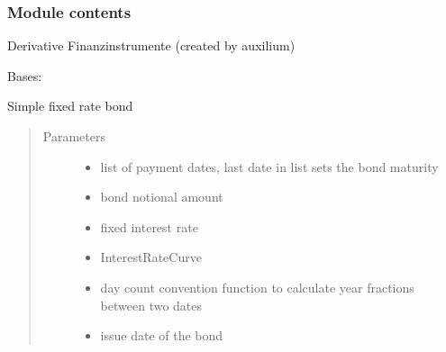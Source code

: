 \documentclass[a4paper,10pt,english]{sphinxmanual}
\begin{document}
\subsubsection{Module contents}
\label{\detokenize{api/Derivate:module-Derivate}}\label{\detokenize{api/Derivate:module-contents}}
\sphinxAtStartPar
Derivative Finanzinstrumente (created by auxilium)

\begin{fulllineitems}
\label{\detokenize{api/Derivate:Derivate.BondCashFlowLegList}}
\sphinxAtStartPar
Bases: 

\sphinxAtStartPar
Simple fixed rate bond
\begin{quote}\begin{description}
\item[{Parameters}] \leavevmode\begin{itemize}
\item {} 
\sphinxAtStartPar
{} \textendash{} list of payment dates,
last date in list sets the bond maturity

\item {} 
\sphinxAtStartPar
{} \textendash{} bond notional amount

\item {} 
\sphinxAtStartPar
{} \textendash{} fixed interest rate

\item {} 
\sphinxAtStartPar
{} \textendash{} InterestRateCurve

\item {} 
\sphinxAtStartPar
{} \textendash{} day count convention function
to calculate year fractions between two dates

\item {} 
\sphinxAtStartPar
{} \textendash{} issue date of the bond


\end{itemize}
\end{description}
\end{quote}
\end{fulllineitems}
\end{document}
